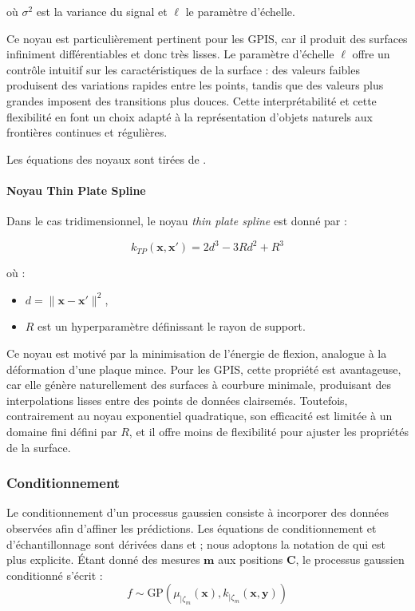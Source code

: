 où $\sigma^2$ est la variance du signal et $\ell$ le paramètre d'échelle.

Ce noyau est particulièrement pertinent pour les GPIS, car il produit des surfaces infiniment différentiables et donc très lisses. Le paramètre d'échelle $\ell$ offre un contrôle intuitif sur les caractéristiques de la surface : des valeurs faibles produisent des variations rapides entre les points, tandis que des valeurs plus grandes imposent des transitions plus douces. Cette interprétabilité et cette flexibilité en font un choix adapté à la représentation d'objets naturels aux frontières continues et régulières.

Les équations des noyaux sont tirées de \textcite{martens2016gpis}.

\paragraph{Noyau Thin Plate Spline}

Dans le cas tridimensionnel, le noyau \textit{thin plate spline} est donné par :

\begin{equation}
k_{TP}(\mathbf{x}, \mathbf{x}') = 2d^3 - 3R d^2 + R^3
\end{equation}

\noindent o\`u :

\begin{itemize}[noitemsep]
    \item $d = \|\mathbf{x} - \mathbf{x}'\|^2$,
    \item $R$ est un hyperparamètre définissant le rayon de support.
\end{itemize}

Ce noyau est motivé par la minimisation de l'énergie de flexion, analogue à la déformation d'une plaque mince. Pour les GPIS, cette propriété est avantageuse, car elle génère naturellement des surfaces à courbure minimale, produisant des interpolations lisses entre des points de données clairsemés. Toutefois, contrairement au noyau exponentiel quadratique, son efficacité est limitée à un domaine fini défini par $R$, et il offre moins de flexibilité pour ajuster les propriétés de la surface.

\subsubsection{Conditionnement}
Le conditionnement d'un processus gaussien consiste à incorporer des données observées afin d'affiner les prédictions. Les équations de conditionnement et d'échantillonnage sont dérivées dans \textcite{martens2016gpis} et \textcite{seyb24from}; nous adoptons la notation de \textcite{seyb24from} qui est plus explicite. Étant donné des mesures $\mathbf{m}$ aux positions $\mathbf{C}$, le processus gaussien conditionné s'écrit :
\begin{equation}
f \sim \text{GP}\left(\mu_{|\zeta_m}(\mathbf{x}), k_{|\zeta_m}(\mathbf{x}, \mathbf{y})\right)
\end{equation}

